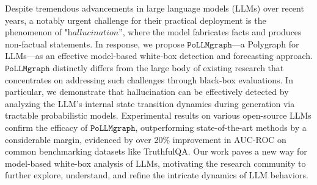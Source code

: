 Despite tremendous advancements in large language models (LLMs) over recent years,  a notably urgent challenge for their practical deployment is the phenomenon of  "$\textit{hallucination}$'', where the model fabricates facts and produces non-factual statements. In response, we propose $\texttt{PoLLMgraph}$—a Polygraph for LLMs—as an effective model-based white-box detection and forecasting approach. $\texttt{PoLLMgraph}$ distinctly differs from the large body of existing research that concentrates on addressing such challenges through black-box evaluations. In particular, we demonstrate that hallucination can be effectively detected by analyzing the LLM's internal state transition dynamics during generation via tractable probabilistic models. Experimental results on various open-source LLMs confirm the efficacy of $\texttt{PoLLMgraph}$, outperforming state-of-the-art methods by a considerable margin, evidenced by over 20\% improvement in AUC-ROC on common benchmarking datasets like TruthfulQA. Our work paves a new way for model-based white-box analysis of LLMs, motivating the research community to further explore, understand, and refine the intricate dynamics of LLM behaviors.